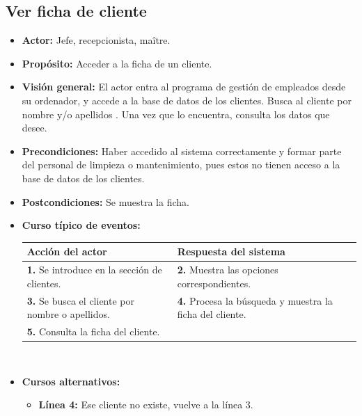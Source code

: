 \documentclass[spanish,a4paper,11pt, twoside]{report}	%
\begin{document}
	\subsection{Ver ficha de cliente}
			\begin{itemize}
			\item \textbf{Actor:} Jefe, recepcionista, maître.
			\item \textbf{Propósito:} Acceder a la ficha de un cliente.
			\item \textbf{Visión general:} El actor entra al programa de gestión de
						empleados desde su ordenador, y accede a la base de datos de los clientes. Busca
						al cliente por nombre y/o apellidos . Una vez que lo encuentra, consulta los
						datos que desee.
			\item \textbf{Precondiciones:} Haber accedido al sistema correctamente y formar
						parte del personal de limpieza o mantenimiento, pues estos no tienen acceso a la
						base de datos de los clientes.
			\item \textbf{Postcondiciones:} Se muestra la ficha.
			\item \textbf{Curso típico de eventos:} 	\\
				\begin{tabular}{|p{6cm}||p{6cm}|}
				\hline
				\textbf{Acción del actor} & \textbf{Respuesta del sistema} \\ \hline \hline
				\textbf{1.} Se introduce en la sección  de clientes. & 
				\textbf{2.} Muestra las opciones correspondientes. \\ \hline 
				\textbf{3.} Se busca el cliente por nombre o apellidos.  & 
				\textbf{4.} Procesa la búsqueda y muestra la ficha del cliente. \\ \hline 
				\textbf{5.} Consulta la ficha del cliente.& \\ \hline
				
			\end{tabular}
			\\
			\item \textbf{Cursos alternativos:} 
			\begin{itemize}
			\item  \textbf{Línea 4:} Ese cliente no existe, vuelve a la línea 3.
			\end {itemize}
		\end{itemize}


		
\end{document}
